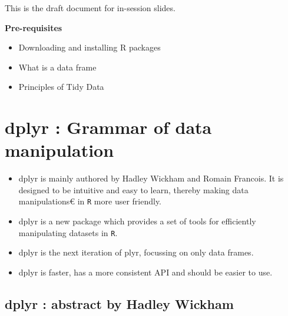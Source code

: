 
	
	\tableofcontents
	\begin{framed}
		This is the draft document for in-session slides.
	\end{framed}
	\textbf{Pre-requisites}
	\begin{itemize}
		\item Downloading and installing R packages
		\item What is a data frame
		\item Principles of Tidy Data
	\end{itemize}
	\newpage
	
	
	
	
	\section{dplyr : Grammar of data manipulation}
	\begin{itemize}
		\item dplyr  is mainly authored by Hadley Wickham and Romain Francois. It is designed to be intuitive and easy to learn, thereby making data manipulations€ in \texttt{R} more user friendly.
		\item dplyr is a new package which provides a set of tools for efficiently manipulating datasets in \texttt{R}.
		\item dplyr is the next iteration of plyr, focussing on only data frames. \item dplyr is faster, has a more consistent API and should be easier to use. 
	\end{itemize}
	
	
	\subsection{dplyr : abstract by Hadley Wickham}
	
